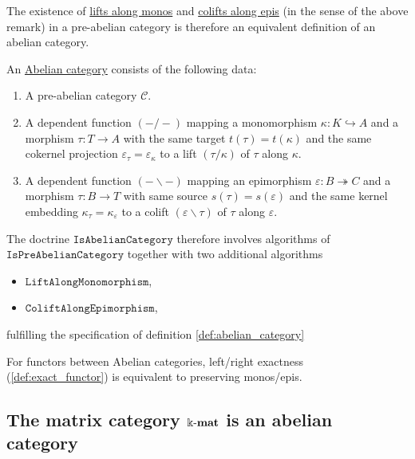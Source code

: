 The existence of \ul{lifts along monos} and \ul{colifts along epis} (in the sense of the above remark)
in a pre-abelian category is therefore an equivalent definition of an abelian category.

\begin{definition}\label{def:abelian_category}
An \ul{Abelian category} consists of the following data:
\begin{enumerate}
\renewcommand{\labelenumi}{(\theenumi)}
\item A pre-abelian category $\mathcal{C}$.
\item A dependent function $( - / - )$ mapping a monomorphism $\kappa : K \hookrightarrow A$ and a morphism $\tau : T \rightarrow A$ with
the same target $t(\tau) = t(\kappa)$ and the same cokernel projection $\varepsilon_{\tau} = \varepsilon_{\kappa}$ to a lift $(\tau / \kappa)$ of
$\tau$ along $\kappa$.
\item A dependent function $( - \backslash - )$ mapping an epimorphism $\varepsilon : B \twoheadrightarrow C$ and a morphism
$\tau : B \rightarrow T$ with same source $s(\tau) = s(\varepsilon)$ and the same kernel embedding $\kappa_{\tau} = \kappa_{\varepsilon}$
to a colift $(\varepsilon \backslash \tau)$ of $\tau$ along $\varepsilon$.
\end{enumerate}
\end{definition}

\begin{doctrine}
The doctrine $\mathtt{IsAbelianCategory}$ therefore involves algorithms of $\mathtt{IsPreAbelianCategory}$ together
with two additional algorithms
\begin{itemize}
\item $\mathtt{LiftAlongMonomorphism}$,
\item $\mathtt{ColiftAlongEpimorphism}$,
\end{itemize}
fulfilling the specification of definition \ref{def:abelian_category}
\end{doctrine}

\begin{lemma}
For functors between Abelian categories, left/right exactness (\ref{def:exact_functor}) is equivalent to preserving monos/epis.
\end{lemma}

\newpage
\subsection{The matrix category $\Bbbk\textnormal{-}\mathbf{mat}$ is an abelian category}

